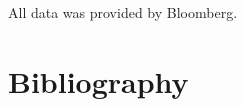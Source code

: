 \documentclass[12pt]{elsarticle}
\begin{document}
All data was provided by Bloomberg.









\pagebreak
\section{Bibliography}








\end{document}
